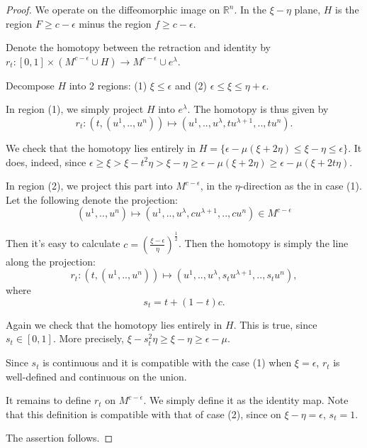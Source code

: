 \documentclass[a4paper,11pt,reqno]{amsart}
\newcommand{\RR}{\mathbb{R}}      %
\begin{document}
\begin{proof}
  We operate on the diffeomorphic image on $\RR^n$. In the $\xi-\eta$ plane, $H$
  is the region $F \ge c-\epsilon$ minus the region $f \ge c-\epsilon$.
  
  Denote the homotopy between the retraction and identity by $r_t : [0,1]\times
  (M^{c-\epsilon}\cup H) \to M^{c-\epsilon} \cup e^\lambda$.
  
  Decompose $H$ into 2 regions: (1) $\xi \le \epsilon$ and (2) $\epsilon \le \xi
  \le \eta + \epsilon$.

  In region (1), we simply project $H$ into $e^\lambda$. The homotopy is thus
  given by 
  \begin{equation}
    r_t: (t, (u^1,..,u^n)) \mapsto (u^1, .., u^\lambda, tu^{\lambda+1}, .., tu^n).
  \end{equation}

  We check that the homotopy lies entirely in $H =
  \{\epsilon-\mu(\xi+2\eta) \le \xi-\eta \le \epsilon \}$. It does,
  indeed, since $\epsilon \ge \xi > \xi-t^2\eta > \xi-\eta \ge
  \epsilon-\mu(\xi+2\eta) \ge \epsilon-\mu(\xi+2t\eta)$.

  In region (2), we project this part into $M^{c-\epsilon}$, in the
  $\eta$-direction as the in case (1). Let the following denote the projection:
  \begin{equation}
    (u^1, .., u^n) \mapsto
    (u^1, .., u^\lambda, cu^{\lambda+1}, .., cu^n) \in M^{c-\epsilon}
  \end{equation}
  
  Then it's easy to calculate $c =
  (\frac{\xi-\epsilon}{\eta})^{\frac{1}{2}}$. Then the homotopy is simply the
  line along the projection:
  \begin{equation}
    r_t: (t, (u^1,..,u^n)) \mapsto
    (u^1, .., u^\lambda, s_tu^{\lambda+1}, .., s_tu^n),
  \end{equation}
  where
  \begin{equation}
    s_t = t + (1-t)c.
  \end{equation}

  Again we check that the homotopy lies entirely in $H$. This is true, since
  $s_t \in [0,1]$. More precisely, $\xi-s_t^2\eta \ge \xi-\eta \ge
  \epsilon-\mu$.


  Since $s_t$ is continuous and it is compatible with the case (1) when $\xi =
  \epsilon$, $r_t$ is well-defined and continuous on the union.

  It remains to define $r_t$ on $M^{c-\epsilon}$. We simply define it as the
  identity map. Note that this definition is compatible with that of case (2),
  since on $\xi-\eta=\epsilon$, $s_t = 1$.

  The assertion follows.
\end{proof}
\end{document}

